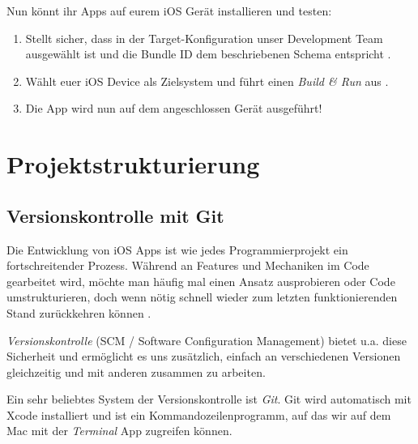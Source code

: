 \documentclass[parskip=half, final]{scrreprt}
\begin{document}
Nun könnt ihr Apps auf eurem iOS Gerät installieren und testen:
\begin{enumerate}
\item Stellt sicher, dass in der Target-Konfiguration unser Development Team ausgewählt ist und die Bundle ID dem beschriebenen Schema entspricht .
\item Wählt euer iOS Device als Zielsystem und führt einen \emph{Build \& Run} aus .
\item Die App wird nun auf dem angeschlossen Gerät ausgeführt!
\end{enumerate}



\chapter{Projektstrukturierung}


\section{Versionskontrolle mit Git} \label{sec:git}

Die Entwicklung von iOS Apps ist wie jedes Programmierprojekt ein fortschreitender Prozess. Während an Features und Mechaniken im Code gearbeitet wird, möchte man häufig mal einen Ansatz ausprobieren oder Code umstrukturieren, doch wenn nötig schnell wieder zum letzten funktionierenden Stand zurückkehren können .


\emph{Versionskontrolle} (SCM / Software Configuration Management) bietet u.a. diese Sicherheit und ermöglicht es uns zusätzlich, einfach an verschiedenen Versionen gleichzeitig und mit anderen zusammen zu arbeiten.

Ein sehr beliebtes System der Versionskontrolle ist \emph{Git}. Git wird automatisch mit Xcode installiert und ist ein Kommandozeilenprogramm, auf das wir auf dem Mac mit der \emph{Terminal} App zugreifen können.
\end{document}
